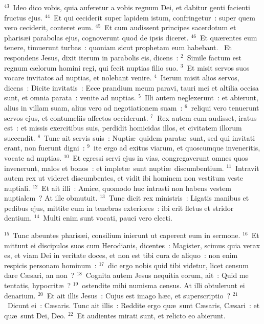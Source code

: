 ${}^{43}$~Ideo dico vobis, quia auferetur a vobis regnum Dei, et dabitur genti facienti fructus ejus.
${}^{44}$~Et qui ceciderit super lapidem istum, confringetur~: super quem vero ceciderit, conteret eum.
${}^{45}$~Et cum audissent principes sacerdotum et pharis\ae i parabolas ejus, cognoverunt quod de ipsis diceret.
${}^{46}$~Et qu\ae rentes eum tenere, timuerunt turbas~: quoniam sicut prophetam eum habebant.
~Et respondens Jesus, dixit iterum in parabolis eis, dicens~:
${}^{2}$~Simile factum est regnum c\ae lorum homini regi, qui fecit nuptias filio suo.
${}^{3}$~Et misit servos suos vocare invitatos ad nuptias, et nolebant venire.
${}^{4}$~Iterum misit alios servos, dicens~: Dicite invitatis~: Ecce prandium meum paravi, tauri mei et altilia occisa sunt, et omnia parata~: venite ad nuptias.
${}^{5}$~Illi autem neglexerunt~: et abierunt, alius in villam suam, alius vero ad negotiationem suam~:
${}^{6}$~reliqui vero tenuerunt servos ejus, et contumeliis affectos occiderunt.
${}^{7}$~Rex autem cum audisset, iratus est~: et missis exercitibus suis, perdidit homicidas illos, et civitatem illorum succendit.
${}^{8}$~Tunc ait servis suis~: Nupti\ae\ quidem parat\ae\ sunt, sed qui invitati erant, non fuerunt digni~:
${}^{9}$~ite ergo ad exitus viarum, et quoscumque inveneritis, vocate ad nuptias.
${}^{10}$~Et egressi servi ejus in vias, congregaverunt omnes quos invenerunt, malos et bonos~: et implet\ae\ sunt nupti\ae\ discumbentium.
${}^{11}$~Intravit autem rex ut videret discumbentes, et vidit ibi hominem non vestitum veste nuptiali.
${}^{12}$~Et ait illi~: Amice, quomodo huc intrasti non habens vestem nuptialem~? At ille obmutuit.
${}^{13}$~Tunc dicit rex ministris~: Ligatis manibus et pedibus ejus, mittite eum in tenebras exteriores~: ibi erit fletus et stridor dentium.
${}^{14}$~Multi enim sunt vocati, pauci vero electi.


${}^{15}$~Tunc abeuntes pharis\ae i, consilium inierunt ut caperent eum in sermone.
${}^{16}$~Et mittunt ei discipulos suos cum Herodianis, dicentes~: Magister, scimus quia verax es, et viam Dei in veritate doces, et non est tibi cura de aliquo~: non enim respicis personam hominum~:
${}^{17}$~dic ergo nobis quid tibi videtur, licet censum dare C\ae sari, an non~?
${}^{18}$~Cognita autem Jesus nequitia eorum, ait~: Quid me tentatis, hypocrit\ae~?
${}^{19}$~ostendite mihi numisma census. At illi obtulerunt ei denarium.
${}^{20}$~Et ait illis Jesus~: Cujus est imago h\ae c, et superscriptio~?
${}^{21}$~Dicunt ei~: C\ae saris. Tunc ait illis~: Reddite ergo qu\ae\ sunt C\ae saris, C\ae sari~: et qu\ae\ sunt Dei, Deo.
${}^{22}$~Et audientes mirati sunt, et relicto eo abierunt.


